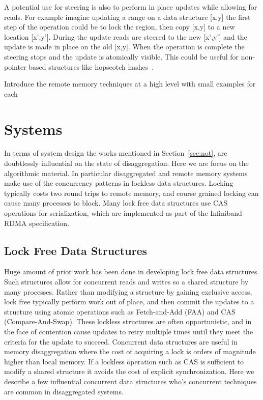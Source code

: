 A potential use for steering is also to perform in place updates while allowing
for reads. For example imagine updating a range on a data structure [x,y] the
first step of the operation could be to lock the region, then copy [x,y] to a
new location [x',y']. During the update reads are steered to the new [x',y'] and
the update is made in place on the old [x,y]. When the operation is complete the
steering stops and the update is atomically visible. This could be useful for
non-pointer based structures like hopscotch hashes~\cite{hopscotch}.


Introduce the remote memory techniques at a high level with small examples for each

\section{Systems}
\label{sec:systems}
In terms of system design the works mentioned in Section~\ref{sec:not}, are
doubtlessly influential on the state of disaggregation. Here we are focus on the
algorithmic material. In particular disaggregated and remote memory systems make
use of the concurrency patterns in lockless data structures. Locking typically
costs two round trips to remote memory, and course grained locking can cause
many processes to block. Many lock free data structures use CAS operations for
serialization, which are implemented as part of the Infiniband RDMA
specification.

\subsection{Lock Free Data Structures}

Huge amount of prior work has been done in developing lock free data structures.
Such structures allow for concurrent reads and writes so a shared structure by
many processes. Rather than modifying a structure by gaining exclusive access,
lock free typically perform work out of place, and then commit the updates to a
structure using atomic operations such as Fetch-and-Add (FAA) and CAS
(Compare-And-Swap). These lockless structures are often opportunistic, and in
the face of contention cause updates to retry multiple times until they meet the
criteria for the update to succeed. Concurrent data structures are useful in
memory disaggregation where the cost of acquiring a lock is orders of magnitude
higher than local memory. If a lockless operation such as CAS is sufficient to
modify a shared structure it avoids the cost of explicit synchronization. Here
we describe a few influential concurrent data structures who's concurrent
techniques are common in disaggregated systems.

